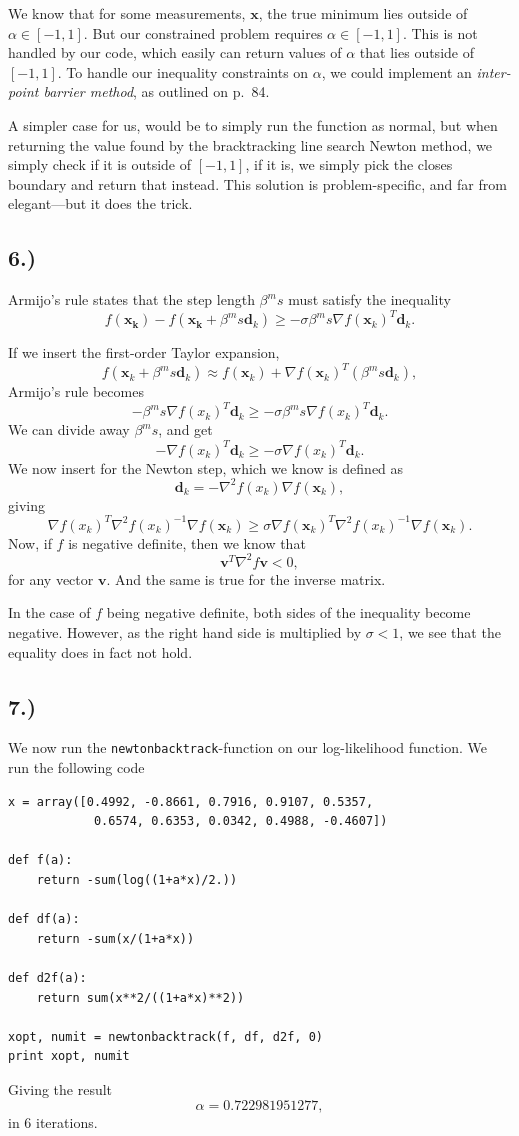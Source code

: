 \documentclass[a4paper, 11pt, notitlepage, english]{article}
\newcommand{\bt}[1]{\boldsymbol{#1}}
\begin{document}
We know that for some measurements, $\bt{x}$, the true minimum lies outside of $\alpha \in [-1,1]$. But our constrained problem requires $\alpha \in [-1,1]$. This is not handled by our code, which easily can return values of $\alpha$ that lies outside of $[-1,1]$. To handle our inequality constraints on $\alpha$, we could implement an \emph{inter-point barrier method}, as outlined on p.\ 84.

A simpler case for us, would be to simply run the function as normal, but when returning the value found by the bracktracking line search Newton method, we simply check if it is outside of $[-1,1]$, if it is, we simply pick the closes boundary and return that instead. This solution is problem-specific, and far from elegant---but it does the trick.

\subsection*{6.) }

Armijo's rule states that the step length $\beta^m s$ must satisfy the inequality
$$f(\bt{x_k}) - f(\bt{x_k} + \beta^m s \bt{d}_k) \geq -\sigma \beta^m  s \nabla f(\bt{x}_k)^T \bt{d}_k.$$

If we insert the first-order Taylor expansion,
$$f(\bt{x}_k + \beta^m s \bt{d}_k) \approx f(\bt{x}_k) + \nabla f(\bt{x}_k)^T (\beta^m s \bt{d}_k),$$
Armijo's rule becomes
$$-\beta^m s \nabla f(x_k)^T \bt{d}_k\geq -\sigma\beta^m s \nabla f(x_k)^T \bt{d}_k.$$
We can divide away $\beta^m s$, and get
$$-\nabla f(x_k)^T \bt{d}_k \geq -\sigma\nabla f(x_k)^T \bt{d}_k.$$
We now insert for the Newton step, which we know is defined as
$$\bt{d}_k = - \nabla^2 f(x_k) \nabla f(\bt{x}_k),$$
giving
$$\nabla f(x_k)^T \nabla^2 f(x_k)^{-1} \nabla f(\bt{x}_k) \geq \sigma \nabla f(\bt{x}_k)^T\nabla^2 f(x_k)^{-1} \nabla f(\bt{x}_k).$$
Now, if $f$ is negative definite, then we know that
$$\bt{v}^T \nabla^2 f \bt{v} < 0,$$
for any vector $\bt{v}$. And the same is true for the inverse matrix. 

In the case of $f$ being negative definite, both sides of the inequality become negative. However, as the right hand side is multiplied by $\sigma<1$, we see that the equality does in fact not hold.

\subsection*{7.)}
We now run the \verb+newtonbacktrack+-function on our log-likelihood function. We run the following code
\begin{lstlisting}
x = array([0.4992, -0.8661, 0.7916, 0.9107, 0.5357, 
            0.6574, 0.6353, 0.0342, 0.4988, -0.4607])

def f(a):
    return -sum(log((1+a*x)/2.))

def df(a):
    return -sum(x/(1+a*x))

def d2f(a):
    return sum(x**2/((1+a*x)**2))

xopt, numit = newtonbacktrack(f, df, d2f, 0)
print xopt, numit
\end{lstlisting}
Giving the result
$$\alpha = 0.722981951277,$$
in 6 iterations.
\end{document}

